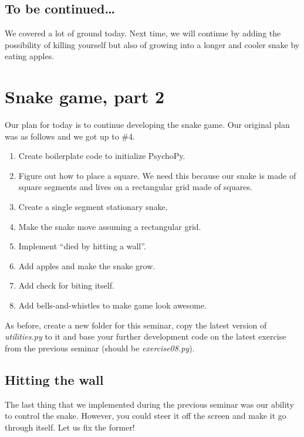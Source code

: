 \documentclass[
]{book}
\providecommand{\tightlist}{%
  \setlength{\itemsep}{0pt}\setlength{\parskip}{0pt}}
\begin{document}
\hypertarget{to-be-continued-1}{%
\section{To be continued\ldots{}}\label{to-be-continued-1}}

We covered a lot of ground today. Next time, we will continue by adding the possibility of killing yourself but also of growing into a longer and cooler snake by eating apples.

\hypertarget{seminar-02-02}{%
\chapter{Snake game, part 2}\label{seminar-02-02}}

Our plan for today is to continue developing the snake game. Our original plan was as follows and we got up to \#4.

\begin{enumerate}
\def\labelenumi{\arabic{enumi}.}
\tightlist
\item
  Create boilerplate code to initialize PsychoPy.
\item
  Figure out how to place a square. We need this because our snake is made of square segments and lives on a rectangular grid made of squares.
\item
  Create a single segment stationary snake.
\item
  Make the snake move assuming a rectangular grid.
\item
  Implement ``died by hitting a wall''.
\item
  Add apples and make the snake grow.
\item
  Add check for biting itself.
\item
  Add bells-and-whistles to make game look awesome.
\end{enumerate}

As before, create a new folder for this seminar, copy the latest version of \emph{utilities.py} to it and base your further development code on the latest exercise from the previous seminar (should be \emph{exercise08.py}).

\hypertarget{hitting-the-wall}{%
\section{Hitting the wall}\label{hitting-the-wall}}

The last thing that we implemented during the previous seminar was our ability to control the snake. However, you could steer it off the screen and make it go through itself. Let us fix the former!
\end{document}
